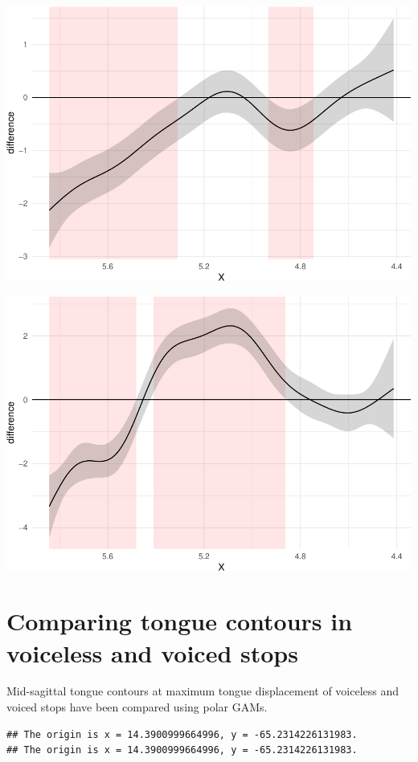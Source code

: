 \documentclass[12pt,]{article}
\begin{document}
\includegraphics{2018-polar-gam_files/figure-latex/diff-it01-a-1.pdf}

\includegraphics{2018-polar-gam_files/figure-latex/diff-it01-u-1.pdf}

\hypertarget{comparing-tongue-contours-in-voiceless-and-voiced-stops}{%
\section{Comparing tongue contours in voiceless and voiced
stops}\label{comparing-tongue-contours-in-voiceless-and-voiced-stops}}

Mid-sagittal tongue contours at maximum tongue displacement of voiceless
and voiced stops have been compared using polar GAMs.

\begin{verbatim}
## The origin is x = 14.3900999664996, y = -65.2314226131983.
## The origin is x = 14.3900999664996, y = -65.2314226131983.
\end{verbatim}
\end{document}
